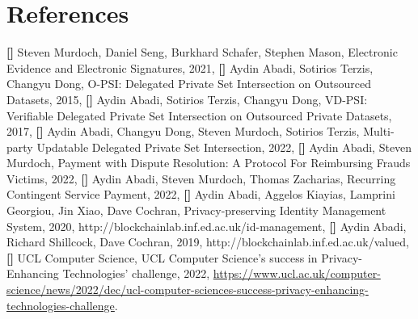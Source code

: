 




\section*{References}


%
\textbf{[\y]} Steven Murdoch, Daniel Seng, Burkhard Schafer, Stephen Mason, Electronic Evidence and Electronic Signatures, 2021,
\textbf{[\y]} Aydin Abadi, Sotirios Terzis, Changyu Dong, O-PSI: Delegated Private Set Intersection on Outsourced Datasets, 2015, \textbf{[\y]} Aydin Abadi, Sotirios Terzis, Changyu Dong, VD-PSI: Verifiable Delegated Private Set Intersection on Outsourced Private Datasets, 2017, \textbf{[\y]} Aydin Abadi, Changyu Dong, Steven Murdoch, Sotirios Terzis, Multi-party Updatable Delegated Private Set Intersection, 2022, \textbf{[\y]} Aydin Abadi, Steven Murdoch, Payment with Dispute Resolution:
A Protocol For Reimbursing Frauds Victims, 2022, \textbf{[\y]} Aydin Abadi, Steven Murdoch, Thomas Zacharias, Recurring Contingent Service Payment, 2022, \textbf{[\y]} Aydin Abadi, Aggelos Kiayias, Lamprini Georgiou, Jin Xiao, Dave Cochran, Privacy-preserving Identity Management System, 2020, http://blockchainlab.inf.ed.ac.uk/id-management, \textbf{[\y]} Aydin Abadi, Richard Shillcock, Dave Cochran, 2019, http://blockchainlab.inf.ed.ac.uk/valued, \textbf{[\y]} UCL Computer Science, UCL Computer Science's success in Privacy-Enhancing Technologies' challenge, 2022, \href{https://www.ucl.ac.uk/computer-science/news/2022/dec/ucl-computer-sciences-success-privacy-enhancing-technologies-challenge}{https://www.ucl.ac.uk/computer-science/news/2022/dec/ucl-computer-sciences-success-privacy-enhancing-technologies-challenge}. 





